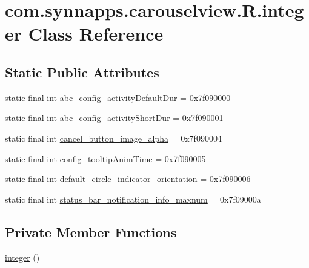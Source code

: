 \hypertarget{classcom_1_1synnapps_1_1carouselview_1_1_r_1_1integer}{}\section{com.\+synnapps.\+carouselview.\+R.\+integer Class Reference}
\label{classcom_1_1synnapps_1_1carouselview_1_1_r_1_1integer}
\subsection*{Static Public Attributes}
\begin{DoxyCompactItemize}
\item 
static final int \mbox{\hyperlink{classcom_1_1synnapps_1_1carouselview_1_1_r_1_1integer_ad315fa79a35c3abe764bf17233c53baa}{abc\+\_\+config\+\_\+activity\+Default\+Dur}} = 0x7f090000
\item 
static final int \mbox{\hyperlink{classcom_1_1synnapps_1_1carouselview_1_1_r_1_1integer_a57b1578d9eb685bd0012594fde691e5a}{abc\+\_\+config\+\_\+activity\+Short\+Dur}} = 0x7f090001
\item 
static final int \mbox{\hyperlink{classcom_1_1synnapps_1_1carouselview_1_1_r_1_1integer_acbf2b453d35e432b9e4f6e6d9c573337}{cancel\+\_\+button\+\_\+image\+\_\+alpha}} = 0x7f090004
\item 
static final int \mbox{\hyperlink{classcom_1_1synnapps_1_1carouselview_1_1_r_1_1integer_a614d690e29e0e484dd4f046c8d0b701a}{config\+\_\+tooltip\+Anim\+Time}} = 0x7f090005
\item 
static final int \mbox{\hyperlink{classcom_1_1synnapps_1_1carouselview_1_1_r_1_1integer_a083073122265de44789c81524d76cad9}{default\+\_\+circle\+\_\+indicator\+\_\+orientation}} = 0x7f090006
\item 
static final int \mbox{\hyperlink{classcom_1_1synnapps_1_1carouselview_1_1_r_1_1integer_a64c9883c6e472de0197a8aa301c5f240}{status\+\_\+bar\+\_\+notification\+\_\+info\+\_\+maxnum}} = 0x7f09000a
\end{DoxyCompactItemize}
\subsection*{Private Member Functions}
\begin{DoxyCompactItemize}
\item 
\mbox{\hyperlink{classcom_1_1synnapps_1_1carouselview_1_1_r_1_1integer_aeee5b47285ca5b9f74c6dc31134a8506}{integer}} ()
\end{DoxyCompactItemize}


